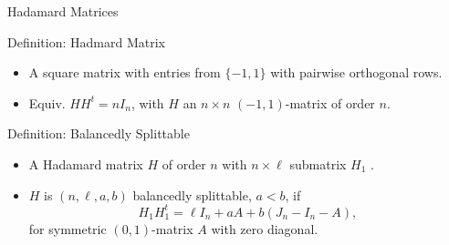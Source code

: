 \documentclass{beamer}
\begin{document}
\begin{frame}{Hadamard Matrices}

  \begin{block}{Definition: Hadmard Matrix}
    \begin{itemize}
    \item A square matrix with entries from $\{-1,1\}$ with pairwise
      orthogonal rows.
    \item Equiv. $HH^t = nI_n$, with $H$ an $n \times n$ $(-1,1)$-matrix of
      order $n$.
    \end{itemize}
  \end{block}

  \pause

  \begin{block}{Definition: Balancedly Splittable \cite[][]{splittable-hadamard}}
    \begin{itemize}
    \item A Hadamard matrix $H$ of order $n$ with $n \times \ell$ submatrix $H_1$ .
      \item $H$ is $(n,\ell,a,b)$ balancedly splittable, $a<b$, if $$H_1H_1^t =
        \ell I_n + aA + b(J_n-I_n-A),$$ for symmetric $(0,1)$-matrix $A$ with
        zero diagonal.
    \end{itemize}
  \end{block}

\end{frame}
\end{document}
